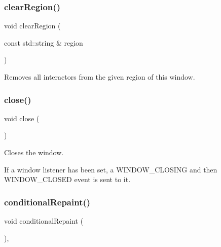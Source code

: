 \mbox{\label{classGWindow_aeba526cb4d6d6f3d8d6f376656af8dc8}} 
\subsubsection{\texorpdfstring{clear\+Region()}{clearRegion()}\hspace{0.1cm}{\footnotesize\ttfamily [2/2]}}
{\footnotesize\ttfamily void clear\+Region (\begin{DoxyParamCaption}\item[{const std\+::string \&}]{region }\end{DoxyParamCaption})\hspace{0.3cm}{\ttfamily [virtual]}}



Removes all interactors from the given region of this window. 

\mbox{\label{classGWindow_a5ae591df94fc66ccb85cbb6565368bca}} 
\subsubsection{\texorpdfstring{close()}{close()}}
{\footnotesize\ttfamily void close (\begin{DoxyParamCaption}{ }\end{DoxyParamCaption})\hspace{0.3cm}{\ttfamily [virtual]}}



Closes the window. 

If a window listener has been set, a W\+I\+N\+D\+O\+W\+\_\+\+C\+L\+O\+S\+I\+NG and then W\+I\+N\+D\+O\+W\+\_\+\+C\+L\+O\+S\+ED event is sent to it. \mbox{\label{classGDrawingSurface_a221b3e75bb3d9d0bfea62b3364e6773b}} 
\subsubsection{\texorpdfstring{conditional\+Repaint()}{conditionalRepaint()}}
{\footnotesize\ttfamily void conditional\+Repaint (\begin{DoxyParamCaption}{ }\end{DoxyParamCaption})\hspace{0.3cm}{\ttfamily [virtual]}, {\ttfamily [inherited]}}



